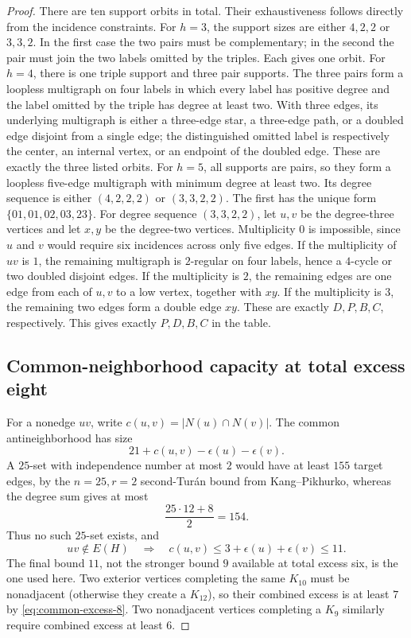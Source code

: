 \begin{proof}
There are ten support orbits in total. Their exhaustiveness follows directly from the incidence constraints. For $h=3$, the support sizes are either $4,2,2$ or $3,3,2$. In the first case the two pairs must be complementary; in the second the pair must join the two labels omitted by the triples. Each gives one orbit. For $h=4$, there is one triple support and three pair supports. The three pairs form a loopless multigraph on four labels in which every label has positive degree and the label omitted by the triple has degree at least two. With three edges, its underlying multigraph is either a three-edge star, a three-edge path, or a doubled edge disjoint from a single edge; the distinguished omitted label is respectively the center, an internal vertex, or an endpoint of the doubled edge. These are exactly the three listed orbits. For $h=5$, all supports are pairs, so they form a loopless five-edge multigraph with minimum degree at least two. Its degree sequence is either $(4,2,2,2)$ or $(3,3,2,2)$. The first has the unique form $\{01,01,02,03,23\}$. For degree sequence $(3,3,2,2)$, let $u,v$ be the degree-three vertices and let $x,y$ be the degree-two vertices. Multiplicity $0$ is impossible, since $u$ and $v$ would require six incidences across only five edges. If the multiplicity of $uv$ is $1$, the remaining multigraph is $2$-regular on four labels, hence a $4$-cycle or two doubled disjoint edges. If the multiplicity is $2$, the remaining edges are one edge from each of $u,v$ to a low vertex, together with $xy$. If the multiplicity is $3$, the remaining two edges form a double edge $xy$. These are exactly $D,P,B,C$, respectively. This gives exactly $P,D,B,C$ in the table.

\subsection*{Common-neighborhood capacity at total excess eight}

For a nonedge $uv$, write $c(u,v)=|N(u)\cap N(v)|$. The common antineighborhood has size
\[
21+c(u,v)-\epsilon(u)-\epsilon(v).
\]
A $25$-set with independence number at most $2$ would have at least $155$ target edges, by the $n=25,r=2$ second-Tur\'an bound from Kang--Pikhurko, whereas the degree sum gives at most
\[
\frac{25\cdot12+8}{2}=154.
\]
Thus no such $25$-set exists, and
\begin{equation}
uv\notin E(H)\quad\Longrightarrow\quad
c(u,v)\leq3+\epsilon(u)+\epsilon(v)\leq11.
\label{eq:common-excess-8}
\end{equation}
The final bound $11$, not the stronger bound $9$ available at total excess six, is the one used here. Two exterior vertices completing the same $K_{10}$ must be nonadjacent (otherwise they create a $K_{12}$), so their combined excess is at least $7$ by \eqref{eq:common-excess-8}. Two nonadjacent vertices completing a $K_9$ similarly require combined excess at least $6$.


\end{proof}

